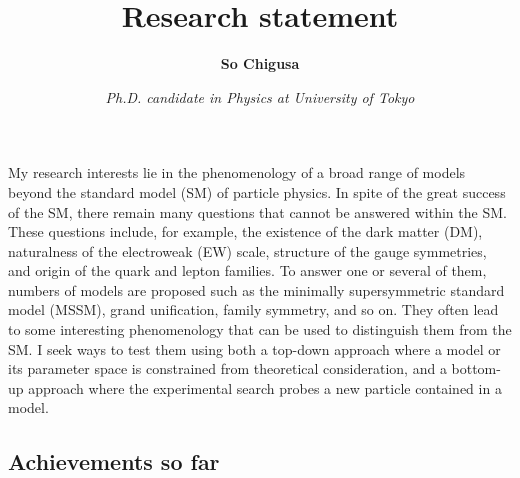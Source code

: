 \documentclass[12pt,notitlepage]{article}
\title{\vspace*{-3cm}Research statement}
\author{\textbf{So Chigusa}}
\date{\vspace*{-4mm}\textit{Ph.D. candidate in Physics at University of Tokyo}}
\begin{document}
\maketitle

My research interests lie in the phenomenology of a broad range of models beyond the standard model (SM) of particle physics.
In spite of the great success of the SM, there remain many questions that cannot be answered within the SM.
These questions include, for example, the existence of the dark matter (DM), naturalness of the electroweak (EW) scale, structure of the gauge symmetries, and origin of the quark and lepton families.
To answer one or several of them, numbers of models are proposed such as the minimally supersymmetric standard model (MSSM), grand unification, family symmetry, and so on.
They often lead to some interesting phenomenology that can be used to distinguish them from the SM.
I seek ways to test them using both a top-down approach where a model or its parameter space is constrained from theoretical consideration, and a bottom-up approach where the experimental search probes a new particle contained in a model.

\vspace*{-2mm}
\subsection*{Achievements so far}

\end{document}
